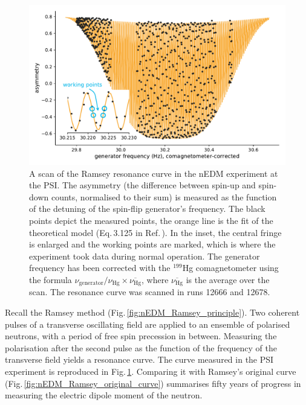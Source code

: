 \begin{figure}
  \centering
  \includegraphics[width=\linewidth]{gfx/nEDMatPSI/ramsey_scan.pdf}
  \caption{A scan of the Ramsey resonance curve in the nEDM experiment at the PSI\@.
  The asymmetry (the difference between spin-up and spin-down counts, normalised to their sum) is measured as the function of the detuning of the spin-flip generator's frequency.
  The black points depict the measured points, the orange line is the fit of the theoretical model (Eq.\,3.125 in Ref.\,\cite{May1998}).
  In the inset, the central fringe is enlarged and the working points are marked, which is where the experiment took data during normal operation.
  The generator frequency has been corrected with the $^{199}$Hg comagnetometer using the formula $\nu_\text{generator} / \nu_\text{Hg} \times \overline{\nu_\text{Hg}}$, where $\overline{\nu_\text{Hg}}$ is the average over the scan.
  The resonance curve was scanned in runs 12666 and 12678.}\label{fig:ramsey_scan}
\end{figure}

Recall the Ramsey method (Fig.\,\ref{fig:nEDM_Ramsey_principle}).
Two coherent pulses of a transverse oscillating field are applied to an ensemble of polarised neutrons, with a period of free spin precession in between.
Measuring the polarisation after the second pulse as the function of the frequency of the transverse field yields a resonance curve.
The curve measured in the PSI experiment is reproduced in Fig.\,\ref{fig:ramsey_scan}.
Comparing it with Ramsey's original curve (Fig.\,\ref{fig:nEDM_Ramsey_original_curve}) summarises fifty years of progress in measuring the electric dipole moment of the neutron.

